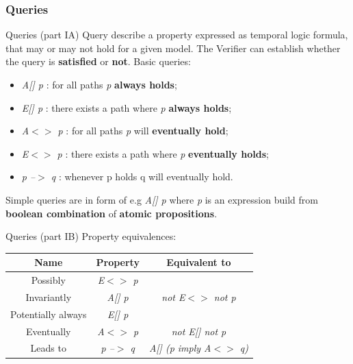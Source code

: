 \documentclass{beamer}
\begin{document}
\subsubsection{Queries}

\begin{frame}{Queries (part IA)}	
	Query describe a property expressed as temporal logic formula, that may or may not hold for a given model. The Verifier can establish whether the query is \textbf{satisfied} or \textbf{not}.\newline
	Basic queries:
	\begin{itemize}
		\item \textit{A[] p} : for all paths \textit{p} \textbf{always holds};
		\item \textit{E[] p} : there exists a path where \textit{p} \textbf{always holds};		
		\item \textit{A$<>$ p} : for all paths \textit{p} will \textbf{eventually hold};
		\item \textit{E$<>$ p} : there exists a path where \textit{p} \textbf{eventually holds};
		\item \textit{p --$>$ q} : whenever p holds q will eventually hold.

	\end{itemize}
	
	Simple queries are in form of e.g \textit{A[] p} where \textit{p} is an expression build from \textbf{boolean combination} of \textbf{atomic propositions}.
\end{frame}

\begin{frame}{Queries (part IB)}
	Property equivalences:
	\begin{tabular}{|c|c|c|}
		\hline \textbf{Name} & \textbf{Property} &\textbf{ Equivalent to }\\ 
		\hline Possibly & \textit{E$<>$ p} &  \\ 
		\hline Invariantly & \textit{A[] p}  & \textit{not E$<>$ not p} \\ 
		\hline Potentially always &	\textit{E[] p}  &  \\ 
		\hline Eventually & \textit{A$<>$ p} & \textit{not E[] not p} \\ 
		\hline Leads to & \textit{p --$>$ q} & \textit{A[] (p imply A$<>$ q)} \\ 
		\hline 
	\end{tabular} 
\end{frame}
\end{document}
